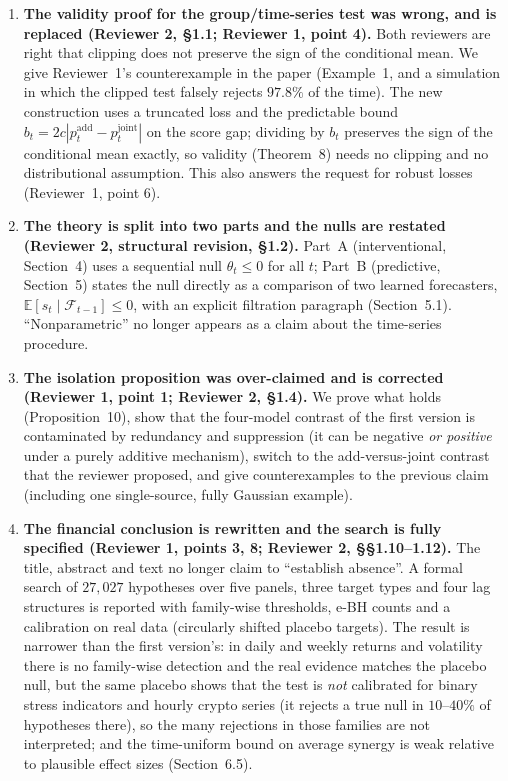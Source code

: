 \documentclass[11pt,a4paper]{article}
\begin{document}
\begin{enumerate}
\item \textbf{The validity proof for the group/time-series test was wrong, and is replaced (Reviewer 2, \S1.1; Reviewer 1, point 4).} Both reviewers are right that clipping does not preserve the sign of the conditional mean. We give Reviewer~1's counterexample in the paper (Example~1, and a simulation in which the clipped test falsely rejects $97.8\%$ of the time). The new construction uses a truncated loss and the predictable bound $b_t=2c|p^{\mathrm{add}}_t-p^{\mathrm{joint}}_t|$ on the score gap; dividing by $b_t$ preserves the sign of the conditional mean exactly, so validity (Theorem~8) needs no clipping and no distributional assumption. This also answers the request for robust losses (Reviewer~1, point 6).
\item \textbf{The theory is split into two parts and the nulls are restated (Reviewer 2, structural revision, \S1.2).} Part~A (interventional, Section~4) uses a sequential null $\theta_t\le0$ for all $t$; Part~B (predictive, Section~5) states the null directly as a comparison of two learned forecasters, $\mathbb E[s_t\mid\mathcal F_{t-1}]\le0$, with an explicit filtration paragraph (Section~5.1). ``Nonparametric'' no longer appears as a claim about the time-series procedure.
\item \textbf{The isolation proposition was over-claimed and is corrected (Reviewer 1, point 1; Reviewer 2, \S1.4).} We prove what holds (Proposition~10), show that the four-model contrast of the first version is contaminated by redundancy and suppression (it can be negative \emph{or positive} under a purely additive mechanism), switch to the add-versus-joint contrast that the reviewer proposed, and give counterexamples to the previous claim (including one single-source, fully Gaussian example).
\item \textbf{The financial conclusion is rewritten and the search is fully specified (Reviewer 1, points 3, 8; Reviewer 2, \S\S1.10--1.12).} The title, abstract and text no longer claim to ``establish absence''. A formal search of $27{,}027$ hypotheses over five panels, three target types and four lag structures is reported with family-wise thresholds, e-BH counts and a calibration on real data (circularly shifted placebo targets). The result is narrower than the first version's: in daily and weekly returns and volatility there is no family-wise detection and the real evidence matches the placebo null, but the same placebo shows that the test is \emph{not} calibrated for binary stress indicators and hourly crypto series (it rejects a true null in $10$--$40\%$ of hypotheses there), so the many rejections in those families are not interpreted; and the time-uniform bound on average synergy is weak relative to plausible effect sizes (Section~6.5).

\end{enumerate}
\end{document}
